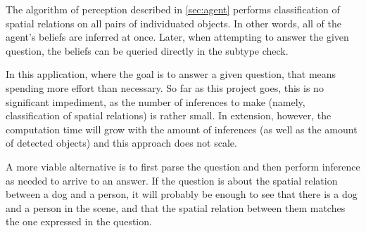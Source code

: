 The algorithm of perception described in \autoref{sec:agent} performs classification of spatial relations on all pairs of individuated objects.
In other words, all of the agent's beliefs are inferred at once.
Later, when attempting to answer the given question, the beliefs can be queried directly in the subtype check.

In this application, where the goal is to answer a given question, that means spending more effort than necessary.
So far as this project goes, this is no significant impediment, as the number of inferences to make (namely, classification of spatial relations) is rather small.
In extension, however, the computation time will grow with the amount of inferences (as well as the amount of detected objects) and this approach does not scale.

A more viable alternative is to first parse the question and then perform inference as needed to arrive to an answer.
If the question is about the spatial relation between a dog and a person, it will probably be enough to see that there is a dog and a person in the scene, and that the spatial relation between them matches the one expressed in the question.
